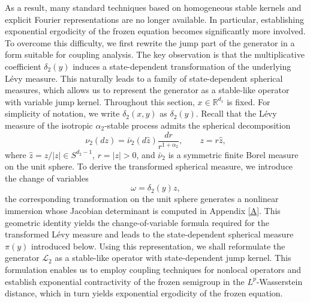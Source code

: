 \documentclass[11pt,reqno]{amsart}
\numberwithin{equation}{section}
\begin{document}
As a result, many standard techniques based on homogeneous stable kernels and explicit Fourier representations are no longer available. In particular, establishing exponential ergodicity of the frozen equation becomes significantly more involved.
To overcome this difficulty, we first rewrite the jump part of the generator in a form suitable for coupling analysis. The key observation is that the multiplicative coefficient $\delta_2(y)$ induces a state-dependent transformation of the underlying Lévy measure. This naturally leads to a family of state-dependent spherical measures, which allows us to represent the generator as a stable-like operator with variable jump kernel.
Throughout this section, $x\in\mathbb{R}^{d_1}$ is fixed. For simplicity of notation, we write $\delta_2(x,y)$ as $\delta_2(y)$. Recall that the Lévy measure of the isotropic $\alpha_2$-stable process admits the spherical decomposition
$$
\nu_2(dz)=
\bar{\nu}_2(d\hat z)\frac{dr}{r^{1+\alpha_2}},
\qquad
z=r\hat z,
$$
where $\hat z=z/|z|\in S^{d_2-1}$, $r=|z|>0$, and $\bar\nu_2$ is a symmetric finite Borel measure on the unit sphere.
To derive the transformed spherical measure, we introduce the change of variables
$$
\omega=\delta_2(y)z,
$$
the corresponding transformation on the unit sphere generates a nonlinear immersion whose Jacobian determinant is computed in Appendix \ref{A}. This geometric identity yields the change-of-variable formula required for the transformed Lévy measure and leads to the state-dependent spherical measure $\pi(y)$ introduced below.
Using this representation, we shall reformulate the generator $\mathcal{L}_2$ as a stable-like operator with state-dependent jump kernel. This formulation enables us to employ coupling techniques for nonlocal operators and establish exponential contractivity of the frozen semigroup in the $L^p$-Wasserstein distance, which in turn yields exponential ergodicity of the frozen equation.
\end{document}
